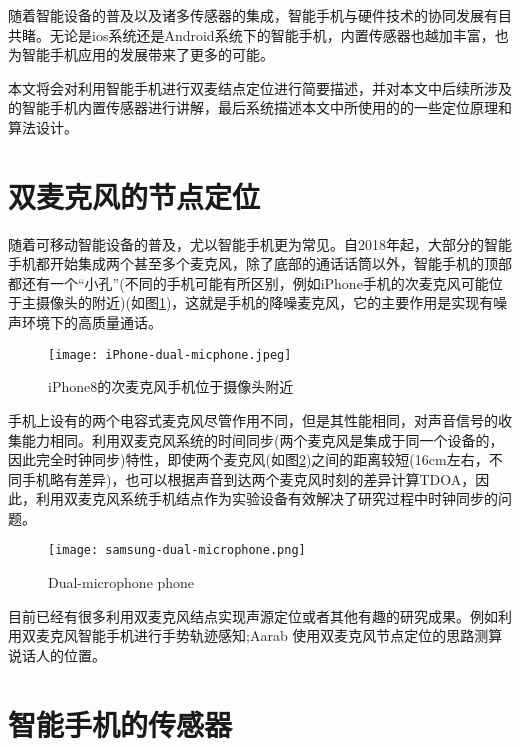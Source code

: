 \documentclass[winfonts]{njuthesis}
\begin{document}
	随着智能设备的普及以及诸多传感器的集成，智能手机与硬件技术的协同发展有目共睹。无论是ios系统还是Android系统下的智能手机，内置传感器也越加丰富，也为智能手机应用的发展带来了更多的可能。

	本文将会对利用智能手机进行双麦结点定位进行简要描述，并对本文中后续所涉及的智能手机内置传感器进行讲解，最后系统描述本文中所使用的的一些定位原理和算法设计。

	\section{双麦克风的节点定位}
	
	随着可移动智能设备的普及，尤以智能手机更为常见。自2018年起，大部分的智能手机都开始集成两个甚至多个麦克风，除了底部的通话话筒以外，智能手机的顶部都还有一个“小孔”(不同的手机可能有所区别，例如iPhone手机的次麦克风可能位于主摄像头的附近)(如图\ref{fig: iphone-dual-microphone})，这就是手机的降噪麦克风，它的主要作用是实现有噪声环境下的高质量通话。
	
	\begin{figure}[htbp]
		\centering
		\texttt{[image: iPhone-dual-micphone.jpeg]} 
		\caption{iPhone8的次麦克风手机位于摄像头附近}
		\label{fig: iphone-dual-microphone}
	\end{figure}
	
	手机上设有的两个电容式麦克风尽管作用不同，但是其性能相同，对声音信号的收集能力相同。利用双麦克风系统的时间同步(两个麦克风是集成于同一个设备的，因此完全时钟同步)特性，即使两个麦克风(如图\ref{fig: samsung-dual-microphone})之间的距离较短(16cm左右，不同手机略有差异)，也可以根据声音到达两个麦克风时刻的差异计算TDOA，因此，利用双麦克风系统手机结点作为实验设备有效解决了研究过程中时钟同步的问题。
	
	\begin{figure}[htbp]
		\centering
		\texttt{[image: samsung-dual-microphone.png]} 
		\caption{Dual-microphone phone}
		\label{fig: samsung-dual-microphone}
	\end{figure}
	
	目前已经有很多利用双麦克风结点实现声源定位或者其他有趣的研究成果。例如利用双麦克风智能手机进行手势轨迹感知\cite{VSkin};Aarab 使用双麦克风节点定位的思路测算说话人的位置\cite{DMArrays}。
	
	\section{智能手机的传感器}
	
\end{document}
